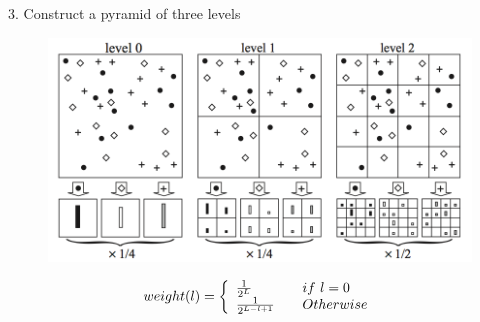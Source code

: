 \begin{frame}{3. Construct a pyramid of three levels}
			
			\begin{figure}[!ht]
				\centering
				\includegraphics[scale=0.5]{./SpatialPyramidMatch.png}
			\end{figure}

			\begin{equation}
			 weight(l) = \left\{ 
			\begin{array}{l l}
			  \frac{1}{2^L} & \quad \text{$if \ l = 0$ }\\
			  \frac{1}{2^{L-l+1}} & \quad \text{$Otherwise$}
			\end{array} \right.
			\end{equation}

\end{frame}

